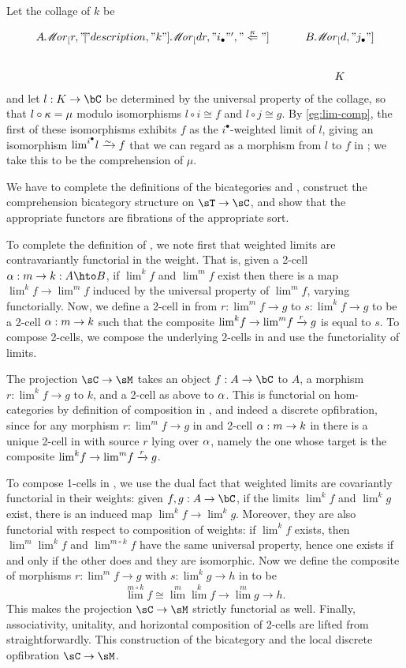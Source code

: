 \documentclass{amsart}
\def\ar#1{\mathscr{M}\!\mathit{or}_{#1}}
\def\rep#1{{#1}_\bullet}
\def\corep#1{{#1}^\bullet}
\let\mylim\lim
\def\lim{{\textstyle\mylim}}
\begin{document}
\begin{prob}
\begin{itemize}
    Let the collage of $k$ be
    \[
    \begin{tikzcd}
      A \ar[r,"\mathclap{|}" description,"k"] \ar[dr,"\rep i"',"\overset\kappa\Leftarrow"] & B \ar[d,"\rep j"] \\ & K
    \end{tikzcd}
    \]
    and let $l:K\to \bC$ be determined by the universal property of the collage, so that $l \circ \kappa = \mu$ modulo isomorphisms $l\circ i\cong f$ and $l\circ j \cong g$.
    By \cref{eg:lim-comp}, the first of these isomorphisms exhibits $f$ as the $\corep i$-weighted limit of $l$, giving an isomorphism $\lim^{\corep i} l \toiso f$ that we can regard as a morphism from $l$ to $f$ in \sC; we take this to be the comprehension of $\mu$.
  \end{itemize}
\end{prob}
\begin{constr}
  We have to complete the definitions of the bicategories \sC and \sT, construct the comprehension bicategory structure on $\sT\to\sC$, and show that the appropriate functors are fibrations of the appropriate sort.

  To complete the definition of \sC, we note first that weighted limits are contravariantly functorial in the weight.
  That is, given a 2-cell $\al:m\to k:A\hto B$, if $\lim^k f$ and $\lim^m f$ exist then there is a map $\lim^k f\to\lim^m f$ induced by the universal property of $\lim^m f$, varying functorially.
  Now, we define a 2-cell in \sC from $r:\lim^m f \to g$ to $s:\lim^k f \to g$ to be a 2-cell $\alpha:m\to k$ such that the composite $\lim^k f\to\lim^m f \xto{r} g$ is equal to $s$.
  To compose 2-cells, we compose the underlying 2-cells in \sM and use the functoriality of limits.

  The projection $\sC\to\sM$ takes an object $f:A\to \bC$ to $A$, a morphism $r:\lim^k f \to g$ to $k$, and a 2-cell as above to $\alpha$.
  This is functorial on hom-categories by definition of composition in \sC, and indeed a discrete opfibration, since for any morphism $r:\lim^m f \to g$ in \sC and 2-cell $\alpha:m\to k$ in \sM there is a unique 2-cell in \sC with source $r$ lying over $\alpha$, namely the one whose target is the composite $\lim^k f\to\lim^m f \xto{r} g$.

  To compose 1-cells in \sC, we use the dual fact that weighted limits are covariantly functorial in their weights: given $f,g:A\to \bC$, if the limits $\lim^k f$ and $\lim^k g$ exist, there is an induced map $\lim^k f\to\lim^k g$.
  Moreover, they are also functorial with respect to composition of weights: if $\lim^k f$ exists, then $\lim^m \lim^k f$ and $\lim^{m\circ k} f$ have the same universal property, hence one exists if and only if the other does and they are isomorphic.
  Now we define the composite of morphisms $r:\lim^m f \to g$ with $s:\lim^k g\to h$ in \sC to be
  \[ \lim^{m\circ k} f \cong \lim^m \lim^k f \to \lim^m g \to h. \]
  This makes the projection $\sC\to\sM$ strictly functorial as well.
  Finally, associativity, unitality, and horizontal composition of 2-cells are lifted from \sM straightforwardly.
  This construction of the bicategory \sC and the local discrete opfibration $\sC\to\sM$.


\end{constr}
\end{document}
